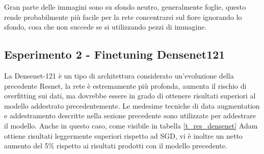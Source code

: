 Gran parte delle immagini sono su sfondo neutro, generalmente foglie, questo rende probabilmente più facile per la rete concentrarsi sul fiore ignorando lo sfondo, cosa che non succede se si utilizzando pezzi di immagine.
\subsection{Esperimento 2 - Finetuning Densenet121}
La Densenet-121 \cite{huang2016densely} è un tipo di architettura considerato un'evoluzione della precedente Resnet, la rete è estremamente più profonda, aumenta il rischio di overfitting sui dati, ma dovrebbe essere in grado di ottenere risultati superiori al modello addestrato precedentemente. Le medesime tecniche di data augmentation e addestramento descritte nella sezione precedente sono utilizzate per addestrare il modello.
Anche in questo caso, come visibile in tabella \ref{t_res_densenet} Adam ottiene risultati leggermente superiori rispetto ad SGD, vi è inoltre un netto aumento del 5\% rispetto ai risultati prodotti con il modello precedente.
